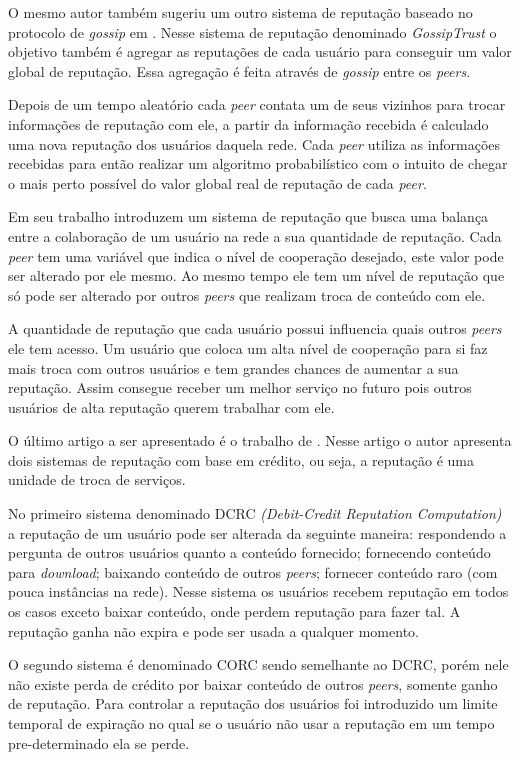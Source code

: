 \documentclass[12pt]{article}
\begin{document}
O mesmo autor também sugeriu um outro sistema de reputação  baseado no protocolo de \emph{gossip} em \cite{zhou2007gossip}. Nesse sistema de reputação denominado \emph{GossipTrust} o objetivo também é agregar as reputações de cada usuário para conseguir um valor global de reputação. Essa agregação é feita através de \emph{gossip} entre os \emph{peers}.

Depois de um tempo aleatório cada \emph{peer} contata um de seus vizinhos para trocar informações de reputação com ele, a partir da informação recebida é calculado uma nova reputação dos usuários daquela rede. Cada \emph{peer} utiliza as informações recebidas para então realizar um algoritmo probabilístico com o intuito de chegar o mais perto possível do valor global real de reputação de cada \emph{peer}.

Em seu trabalho \cite{mortazavi2006cumulative} introduzem um sistema de reputação que busca uma balança entre a colaboração de um usuário na rede a sua quantidade de reputação. Cada \emph{peer} tem uma variável que indica o nível de cooperação desejado, este valor pode ser alterado por ele mesmo. Ao mesmo tempo ele tem um nível de reputação que só pode ser alterado por outros \emph{peers} que realizam troca de conteúdo com ele.

A quantidade de reputação que cada usuário possui influencia quais outros \emph{peers} ele tem acesso. Um usuário que coloca um alta nível de cooperação para si faz mais troca com outros usuários e tem grandes chances de aumentar a sua reputação. Assim consegue receber um melhor serviço no futuro pois outros usuários de alta reputação querem trabalhar com ele.

O último artigo a ser apresentado é o trabalho de \cite{gupta2003reputation}. Nesse artigo o autor apresenta dois  sistemas de reputação com base em crédito, ou seja, a reputação é uma unidade de troca de serviços.

No primeiro sistema denominado DCRC \emph{(Debit-Credit Reputation Computation)} a reputação de um usuário pode ser alterada da seguinte maneira: respondendo a pergunta de outros usuários quanto a conteúdo fornecido; fornecendo conteúdo para \emph{download}; baixando conteúdo de outros \emph{peers}; fornecer conteúdo raro (com pouca instâncias na rede). Nesse sistema os usuários recebem reputação em todos os casos exceto baixar conteúdo, onde perdem reputação para fazer tal. A reputação ganha não expira e pode ser usada a qualquer momento.

O segundo sistema é denominado CORC sendo semelhante ao DCRC, porém nele não existe perda de crédito por baixar conteúdo de outros \emph{peers}, somente ganho de reputação. Para controlar a reputação dos usuários foi introduzido um limite temporal de expiração no qual se o usuário não usar a reputação em um tempo pre-determinado ela se perde. 
\end{document}
